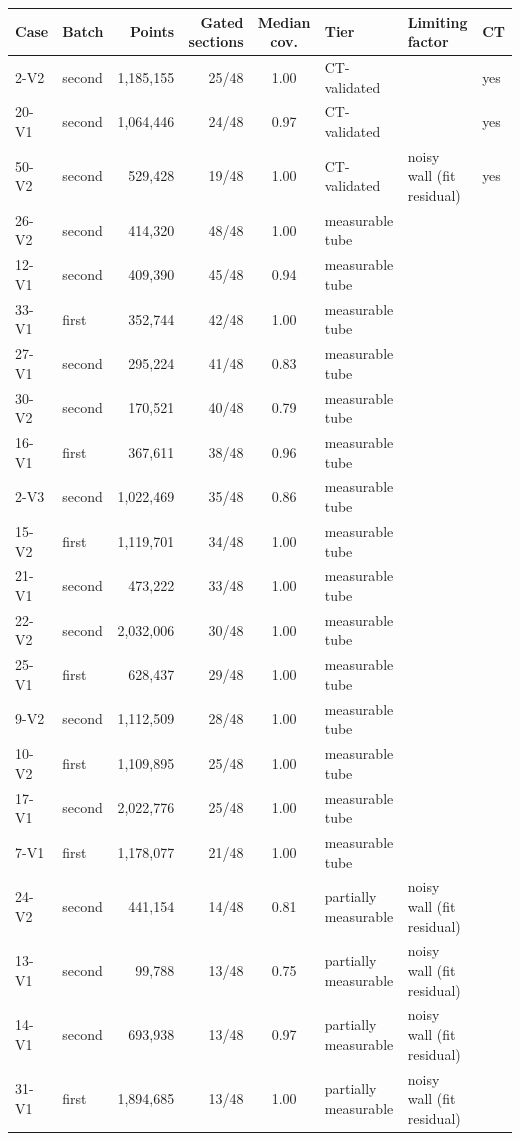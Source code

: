 \begin{tabular}{llrrclll}
\toprule
Case & Batch & Points & Gated sections & Median cov. & Tier & Limiting factor & CT \\
\midrule
2-V2 & second & 1,185,155 & 25/48 & 1.00 & CT-validated &  & yes \\
20-V1 & second & 1,064,446 & 24/48 & 0.97 & CT-validated &  & yes \\
50-V2 & second & 529,428 & 19/48 & 1.00 & CT-validated & noisy wall (fit residual) & yes \\
26-V2 & second & 414,320 & 48/48 & 1.00 & measurable tube &  &  \\
12-V1 & second & 409,390 & 45/48 & 0.94 & measurable tube &  &  \\
33-V1 & first & 352,744 & 42/48 & 1.00 & measurable tube &  &  \\
27-V1 & second & 295,224 & 41/48 & 0.83 & measurable tube &  &  \\
30-V2 & second & 170,521 & 40/48 & 0.79 & measurable tube &  &  \\
16-V1 & first & 367,611 & 38/48 & 0.96 & measurable tube &  &  \\
2-V3 & second & 1,022,469 & 35/48 & 0.86 & measurable tube &  &  \\
15-V2 & first & 1,119,701 & 34/48 & 1.00 & measurable tube &  &  \\
21-V1 & second & 473,222 & 33/48 & 1.00 & measurable tube &  &  \\
22-V2 & second & 2,032,006 & 30/48 & 1.00 & measurable tube &  &  \\
25-V1 & first & 628,437 & 29/48 & 1.00 & measurable tube &  &  \\
9-V2 & second & 1,112,509 & 28/48 & 1.00 & measurable tube &  &  \\
10-V2 & first & 1,109,895 & 25/48 & 1.00 & measurable tube &  &  \\
17-V1 & second & 2,022,776 & 25/48 & 1.00 & measurable tube &  &  \\
7-V1 & first & 1,178,077 & 21/48 & 1.00 & measurable tube &  &  \\
24-V2 & second & 441,154 & 14/48 & 0.81 & partially measurable & noisy wall (fit residual) &  \\
13-V1 & second & 99,788 & 13/48 & 0.75 & partially measurable & noisy wall (fit residual) &  \\
14-V1 & second & 693,938 & 13/48 & 0.97 & partially measurable & noisy wall (fit residual) &  \\
31-V1 & first & 1,894,685 & 13/48 & 1.00 & partially measurable & noisy wall (fit residual) &  \\

\end{tabular}
